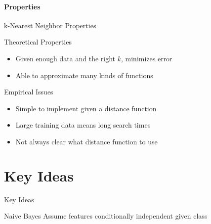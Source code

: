 \documentclass[12pt]{beamer}
\begin{document}
\subsection{Properties}
\begin{frame}[<+->]{k-Nearest Neighbor Properties}
	\begin{block}{Theoretical Properties}
		\begin{itemize}
			\item Given enough data and the right $k$, minimizes error
			\item Able to approximate many kinds of functions
		\end{itemize}
	\end{block}
	\begin{block}{Empirical Issues}
		\begin{itemize}
			\item Simple to implement given a distance function
			\item Large training data means long search times
			\item Not always clear what distance function to use
		\end{itemize}
	\end{block}
\end{frame}


\part{Key Ideas}
\begin{frame}{Key Ideas}
	\begin{block}{Naive Bayes}
		Assume features conditionally independent given class
	\end{block}
\end{frame}
\end{document}
